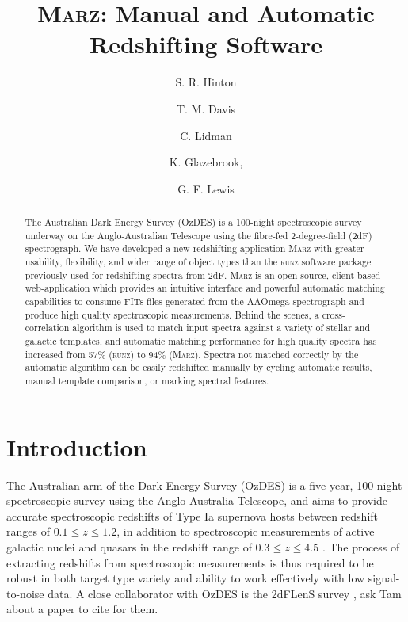 \documentclass[iop]{emulateapj}
\newcommand{\green}{\color{LimeGreen}}
\newcommand{\runz}{\textsc{runz}}
\newcommand{\marz}{\textsc{Marz}}
\begin{document}
\title{\marz{}: Manual and Automatic Redshifting Software}

\author{S. R. Hinton}
\author{T. M. Davis}
\author{C. Lidman}
\author{K. Glazebrook,}
\author{G. F. Lewis}

\begin{abstract}
The Australian Dark Energy Survey (OzDES) is a 100-night spectroscopic survey underway on the Anglo-Australian Telescope using the fibre-fed 2-degree-field (2dF) spectrograph.  We have developed a new redshifting application \marz{} with greater usability, flexibility, and wider range of object types than the \runz{} software package previously used for redshifting spectra from 2dF. \marz{} is an open-source, client-based web-application which provides an intuitive interface and powerful automatic matching capabilities to consume FITs files generated from the AAOmega spectrograph and produce high quality spectroscopic measurements. Behind the scenes, a cross-correlation algorithm is used to match input spectra against a variety of stellar and galactic templates, and automatic matching performance for high quality spectra has increased from 57\% (\runz{}) to 94\% (\marz{}). Spectra not matched correctly by the automatic algorithm can be easily redshifted manually by cycling automatic results, manual template comparison, or marking spectral features.
\end{abstract}

\section{Introduction}

The Australian arm of the Dark Energy Survey (OzDES) is a five-year, 100-night spectroscopic survey using the Anglo-Australia Telescope, and aims to provide accurate spectroscopic redshifts of Type Ia supernova hosts between redshift ranges of $0.1 \leq  z \leq 1.2$, in addition to spectroscopic measurements of active galactic nuclei and quasars in the redshift range of $0.3 \leq z \leq 4.5$ \cite{fang2015}. The process of extracting redshifts from spectroscopic measurements is thus required to be robust in both target type variety and ability to work effectively with low signal-to-noise data. A close collaborator with OzDES is the 2dFLenS survey {\green, ask Tam about a paper to cite for them.}
\end{document}
